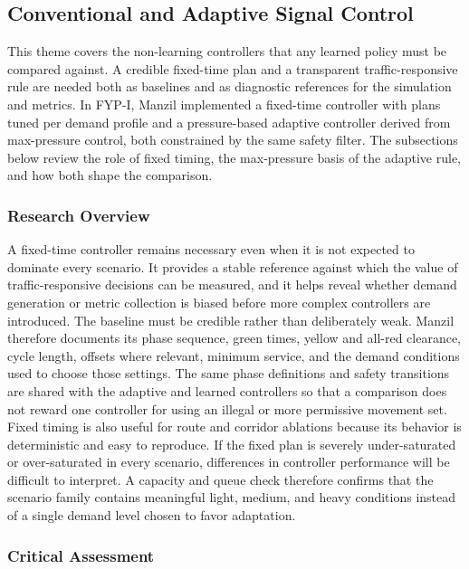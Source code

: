 \subsection{Conventional and Adaptive Signal Control}

This theme covers the non-learning controllers that any learned policy must be compared against. A credible fixed-time plan and a transparent traffic-responsive rule are needed both as baselines and as diagnostic references for the simulation and metrics. In FYP-I, Manzil implemented a fixed-time controller with plans tuned per demand profile and a pressure-based adaptive controller derived from max-pressure control, both constrained by the same safety filter. The subsections below review the role of fixed timing, the max-pressure basis of the adaptive rule, and how both shape the comparison.

\subsubsection{Research Overview}

A fixed-time controller remains necessary even when it is not expected to dominate every scenario. It provides a stable reference against which the value of traffic-responsive decisions can be measured, and it helps reveal whether demand generation or metric collection is biased before more complex controllers are introduced. The baseline must be credible rather than deliberately weak. Manzil therefore documents its phase sequence, green times, yellow and all-red clearance, cycle length, offsets where relevant, minimum service, and the demand conditions used to choose those settings. The same phase definitions and safety transitions are shared with the adaptive and learned controllers so that a comparison does not reward one controller for using an illegal or more permissive movement set. Fixed timing is also useful for route and corridor ablations because its behavior is deterministic and easy to reproduce. If the fixed plan is severely under-saturated or over-saturated in every scenario, differences in controller performance will be difficult to interpret. A capacity and queue check therefore confirms that the scenario family contains meaningful light, medium, and heavy conditions instead of a single demand level chosen to favor adaptation.

\subsubsection{Critical Assessment}

